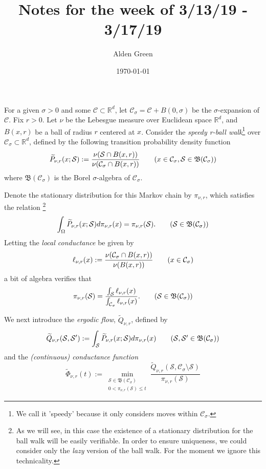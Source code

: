 \documentclass{article}
\newcommand{\Reals}{\mathbb{R}}
\newcommand{\Rd}{\Reals^d}
\newcommand{\Cset}{\mathcal{C}}
\newcommand{\Sset}{\mathcal{S}}
\newcommand{\Csig}{\Cset_{\sigma}}
\newcommand{\1}{\mathbf{1}}
\theoremstyle{alden}
\theoremstyle{aldenthm}
\theoremstyle{remark}
\begin{document}
	
\title{Notes for the week of 3/13/19 - 3/17/19}
\author{Alden Green}
\date{\today}
\maketitle

For a given $\sigma > 0$ and some $\Cset \subset \Rd$, let $\Csig = \Cset + B(0,\sigma)$ be the $\sigma$-expansion of $\Cset$. Fix $r > 0$. Let $\nu$ be the Lebesgue measure over Euclidean space $\Rd$, and $B(x,r)$ be a ball of radius $r$ centered at $x$. Consider the \emph{speedy r-ball walk}\footnote{We call it 'speedy' because it only considers moves within $\Csig$.} over $\Csig \subset \Rd$, defined by the following transition probability density function 
\begin{equation*}
\widetilde{P}_{\nu,r}(x; \Sset) := \frac{\nu(\Sset \cap B(x,r))}{\nu(\Csig \cap B(x,r))} \tag{$x \in \Csig, \Sset \in \mathfrak{B}(\Csig)$}
\end{equation*}
where $\mathfrak{B}(\Csig)$ is the Borel $\sigma$-algebra of $\Csig$. 

Denote the stationary distribution for this Markov chain by $\pi_{\nu,r}$, which satisfies the relation \footnote{As we will see, in this case the existence of a stationary distribution for the ball walk will be easily verifiable. In order to ensure uniqueness, we could consider only the \emph{lazy} version of the ball walk. For the moment we ignore this technicality.}
\begin{equation*}
\int_{\Omega} \widetilde{P}_{\nu,r}(x; \Sset) d\pi_{\nu,r}(x) = \pi_{\nu,r}(\Sset).  \tag{$\Sset \in \mathfrak{B}(\Csig)$}
\end{equation*}
Letting the \emph{local conductance} be given by
\begin{equation*}
\ell_{\nu,r}(x) := \frac{\nu(\Csig \cap B(x,r))}{\nu(B(x,r))} \tag{$x \in \Csig$}
\end{equation*}
a bit of algebra verifies that
\begin{equation*}
\pi_{\nu,r}(\Sset) = \frac{\int_{\Sset} \ell_{\nu,r}(x)}{\int_{\Csig} \ell_{\nu,r}(x)}. \tag{$\Sset \in \mathfrak{B}(\Csig)$}
\end{equation*}

We next introduce the \emph{ergodic flow}, $\widetilde{Q}_{\nu,r}$, defined by
\begin{equation*}
\widetilde{Q}_{\nu,r}(\Sset, \Sset') := \int_{\Sset} \widetilde{P}_{\nu,r}(x; \Sset) d\pi_{\nu,r}(x) \tag{$\Sset, \Sset' \in \mathfrak{B}(\Csig)$}
\end{equation*}
and the \emph{(continuous) conductance function}
\begin{equation*}
\widetilde{\Phi}_{\nu,r}(t) := \min_{\substack{\Sset \in \mathfrak{B}(\Csig) \\ 0 < \pi_{\nu,r}(\Sset) \leq t} } \frac{\widetilde{Q}_{\nu,r}(\Sset, \Csig \setminus \Sset)}{\pi_{\nu,r}(\Sset)} \tag{$0 < t \leq 1/2 $}
\end{equation*}
\end{document}
